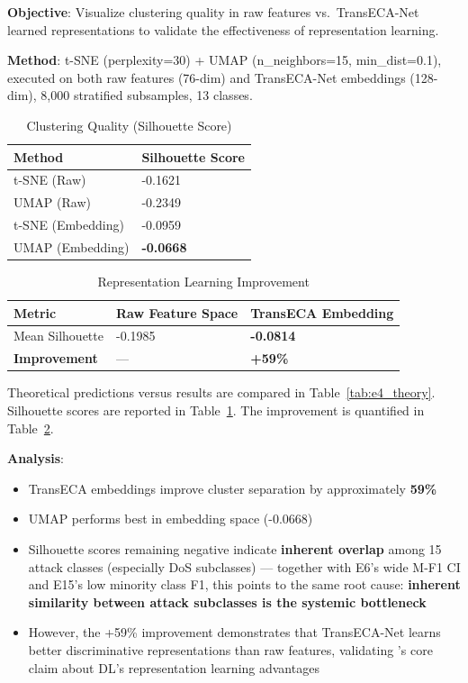 \documentclass[sigconf]{acmart}
\begin{document}
\textbf{Objective}: Visualize clustering quality in raw features vs.\ TransECA-Net learned representations to validate the effectiveness of representation learning.

\textbf{Method}: t-SNE (perplexity=30) + UMAP (n\_neighbors=15, min\_dist=0.1), executed on both raw features (76-dim) and TransECA-Net embeddings (128-dim), 8,000 stratified subsamples, 13 classes.

\begin{table}[!h]
\caption{Clustering Quality (Silhouette Score)}
\label{tab:silhouette}
\begin{tabular}{ll}
\toprule
\textbf{Method} & \textbf{Silhouette Score} \\
\midrule
t-SNE (Raw) & -0.1621 \\
UMAP (Raw) & -0.2349 \\
t-SNE (Embedding) & -0.0959 \\
UMAP (Embedding) & \textbf{-0.0668} \\
\bottomrule
\end{tabular}
\end{table}


\begin{table}[!h]
\caption{Representation Learning Improvement}
\label{tab:repr_learning}
\begin{tabular}{lll}
\toprule
\textbf{Metric} & \textbf{Raw Feature Space} & \textbf{TransECA Embedding} \\
\midrule
Mean Silhouette & -0.1985 & \textbf{-0.0814} \\
\textbf{Improvement} & --- & \textbf{+59\%} \\
\end{tabular}
\end{table}

 Theoretical predictions versus results are compared in Table~\ref{tab:e4_theory}. Silhouette scores are reported in Table~\ref{tab:silhouette}. The improvement is quantified in Table~\ref{tab:repr_learning}.

\textbf{Analysis}:
\begin{itemize}
\item TransECA embeddings improve cluster separation by approximately \textbf{59\%}
\item UMAP performs best in embedding space (-0.0668)
\item Silhouette scores remaining negative indicate \textbf{inherent overlap} among 15 attack classes (especially DoS subclasses) --- together with E6's wide M-F1 CI and E15's low minority class F1, this points to the same root cause: \textbf{inherent similarity between attack subclasses is the systemic bottleneck}
\item However, the +59\% improvement demonstrates that TransECA-Net learns better discriminative representations than raw features, validating \cite{5}'s core claim about DL's representation learning advantages
\end{itemize}
\end{document}
